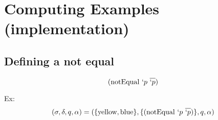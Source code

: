 \documentclass[11pt,a4paper]{report}
\newcommand{\var}[1]{`#1}
\begin{document}
\begin{comment}
\subsection{What john likes?}

A simple example of querying facts.

We start with the definitions/facts:
\begin{enumerate}

\item $(\text{mary}\ \text{likes}\ \text{wine}\ \var{p})$
\subitem mary likes wine.

\item $(\text{mary}\ \text{likes}\ \text{john}\ \var{p})$
\subitem mary likes john.

\item $(\text{peter}\ \text{likes}\ \text{peter}\ \var{p})$
\subitem peter likes himself.

\item $(\text{john}\ \text{likes}\ \var{stuff}\ (\text{mary}\ \text{likes}\ \var{stuff}\ \var{p}))$
\subitem john likes everything that mary likes.

\item $(\text{john}\ \text{likes}\ \var{person}\ (\var{person}\ \text{likes}\ \text{wine}\ \var{p}))$
\subitem john likes anyone that likes wine.

\item \[
    (\text{john}\ \text{likes}\ \var{person}\ (\text{list}\ (\var{person}\ \text{likes}\ \var{person}\ \var{p}) (\text{list}\ (\text{notEqual}\ \var{person} \text{john})\ (\text{list}))))
\]
\subitem john likes anyone that likes themselves.

\end{enumerate}

\end{comment}

\section{Computing Examples (implementation)}

\subsection{Defining a not equal}

\[
    (\text{notEqual}\ \var{p}\ \overline{\var{p}})
\]

Ex:
\[(\sigma, \delta, q, \alpha ) = (\{\text{yellow}, \text{blue}\}, \{(\text{notEqual}\ \var{p}\ \overline{\var{p}})\}, q, \alpha)\]
\end{document}
